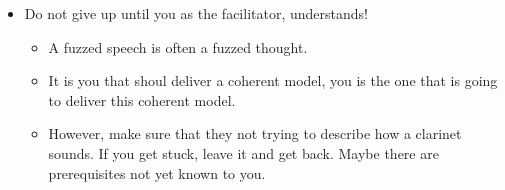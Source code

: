 \begin{itemize}
    \item Do not give up until you as the facilitator, understands!
        \begin{itemize}
            \item A fuzzed speech is often a fuzzed thought.
            \item It is you that shoul deliver a coherent model, you is the one that is going to deliver this coherent model. 
            \item However, make sure that they not trying to describe how a clarinet sounds. If you get stuck, leave it and get back. Maybe there are prerequisites not yet known to you.
        \end{itemize}
\end{itemize}


